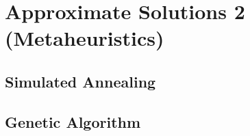 \chapter{Approximate Solutions 2 (Metaheuristics)}

    \section{Simulated Annealing}
        
    \section{Genetic Algorithm}